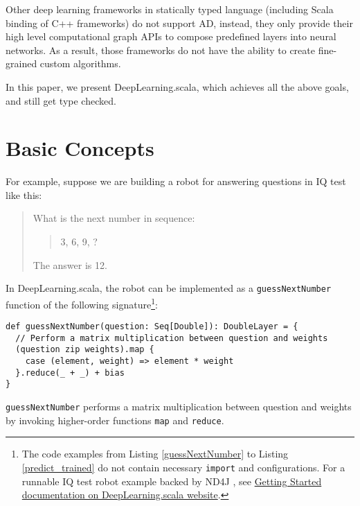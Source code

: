 Other deep learning frameworks in statically typed language (including Scala binding of C++ frameworks) \cite{intel2016bigdl,skymind2017deeplearning4j,baydin2016hype,chen2017typesafe,zhao2017deepdsl} do not support AD, instead, they only provide their high level \gls{computational graph} APIs to compose predefined layers into neural networks. As a result, those frameworks do not have the ability to create fine-grained custom algorithms.

In this paper, we present DeepLearning.scala, which achieves all the above goals, and still get type checked.

\section{Basic Concepts\label{concepts}}

For example, suppose we are building a robot for answering questions in IQ test like this:

\begin{quote}
  What is the next number in sequence:
    \begin{quote}
    3, 6, 9, ?
    \end{quote}
  The answer is 12.
\end{quote}

In DeepLearning.scala, the robot can be implemented as a \lstinline{guessNextNumber} function of the following signature\footnote{The code examples from Listing \ref{guessNextNumber} to Listing \ref{predict_trained} do not contain necessary \lstinline{import} and configurations. For a runnable IQ test robot example backed by ND4J \cite{skymind2017nd4j}, see \href{http://deeplearning.thoughtworks.school/demo/GettingStarted.html}{Getting Started documentation on DeepLearning.scala website}.}:

\begin{lstlisting}[float={htbp},caption={The differentiable matrix multiplication implemented by \lstinline{map}/\lstinline{reduce}},label={guessNextNumber}]
def guessNextNumber(question: Seq[Double]): DoubleLayer = {
  // Perform a matrix multiplication between question and weights
  (question zip weights).map {
    case (element, weight) => element * weight
  }.reduce(_ + _) + bias
}
\end{lstlisting}

\lstinline{guessNextNumber} performs a matrix multiplication between question and weights by invoking higher-order functions \lstinline{map} and \lstinline{reduce}. 

